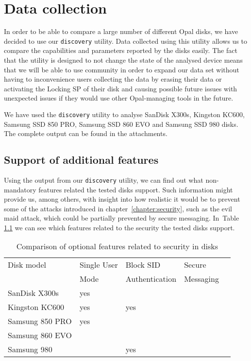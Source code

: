 \chapter{Data collection}
\label{chapter:data}

In order to be able to compare a large number of different Opal disks, we have decided to use our \verb|discovery| utility. 
Data collected using this utility allows us to compare the capabilities and parameters reported by the disks easily. 
The fact that the utility is designed to not change the state of the analysed device means that we will be able to use community in order to expand our data set without having to inconvenience users collecting the data by erasing their data or activating the Locking SP of their disk and causing possible future issues with unexpected issues if they would use other Opal-managing tools in the future.

We have used the \verb|discovery| utility to analyse SanDisk X300s, Kingston KC600, Samsung SSD 850 PRO, Samsung SSD 860 EVO and Samsung SSD 980 disks. The complete output can be found in the attachments.


\section{Support of additional features}

Using the output from our \verb|discovery| utility, we can find out what non-mandatory features related the tested disks support.
Such information might provide us, among others, with insight into how realistic it would be to prevent some of the attacks introduced in chapter~\ref{chapter:security}, such as the evil maid attack, which could be partially prevented by secure messaging.
In~Table \ref{table:compare_feature_sets} we can see which features related to the security the tested disks support.

\begin{table}
\small
\begin{tabularx}{\textwidth}{lXXXX}
\toprule
Disk model      & Single User & Block SID        & Secure  \\ 
                & Mode        & Authentication   & Messaging \\ 
\midrule
SanDisk X300s   & yes              &                          &                   \\
Kingston KC600  & yes              & yes                      &                   \\
Samsung 850 PRO & yes              &                          &                   \\
Samsung 860 EVO &                  &                          &                   \\
Samsung 980     &                  & yes                      &                  \\ 
\bottomrule
\end{tabularx}
\caption{Comparison of optional features related to security in disks}
\label{table:compare_feature_sets}
\end{table}

